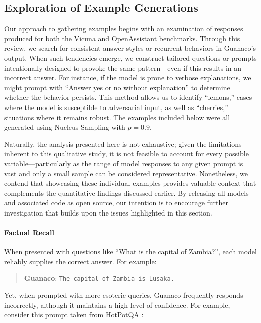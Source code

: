 \subsection{Exploration of Example Generations}
\label{ssec:examples}

Our approach to gathering examples begins with an examination of responses produced for both the Vicuna and OpenAssistant benchmarks. Through this review, we search for consistent answer styles or recurrent behaviors in {Guanaco}'s output. When such tendencies emerge, we construct tailored questions or prompts intentionally designed to provoke the same pattern—even if this results in an incorrect answer. For instance, if the model is prone to verbose explanations, we might prompt with ``Answer yes or no without explanation'' to determine whether the behavior persists. This method allows us to identify ``lemons,'' cases where the model is susceptible to adversarial input, as well as ``cherries,'' situations where it remains robust. The examples included below were all generated using Nucleus Sampling \cite{holtzmancurious} with $p=0.9$.

Naturally, the analysis presented here is not exhaustive; given the limitations inherent to this qualitative study, it is not feasible to account for every possible variable—particularly as the range of model responses to any given prompt is vast and only a small sample can be considered representative. Nonetheless, we contend that showcasing these individual examples provides valuable context that complements the quantitative findings discussed earlier. By releasing all models and associated code as open source, our intention is to encourage further investigation that builds upon the issues highlighted in this section.

\paragraph{Factual Recall} When presented with questions like ``What is the capital of Zambia?'', each model reliably supplies the correct answer. For example:

\begin{quote} 
    \textbf{Guanaco}:
    \texttt{The capital of Zambia is Lusaka.}
\end{quote}

Yet, when prompted with more esoteric queries, {Guanaco} frequently responds incorrectly, although it maintains a high level of confidence. For example, consider this prompt taken from HotPotQA \citep{yang2018hotpotqa}:

